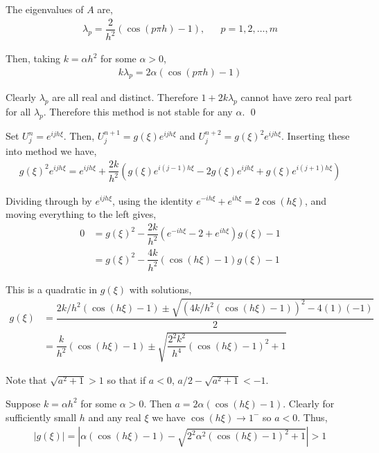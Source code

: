 \documentclass[10pt]{article}
\begin{document}
\begin{solution}[Solution]
\begin{enumerate}[label=(\alph*)]
    The eigenvalues of \( A \) are,
    \begin{align*}
        \lambda_p = \dfrac{2}{h^2}(\cos(p\pi h)-1), && p=1,2,\ldots, m
    \end{align*}

    Then, taking \( k = \alpha h^2 \) for some \( \alpha > 0 \),
    \begin{align*}
        k\lambda_p = 2\alpha(\cos(p\pi h)-1)
    \end{align*}

    Clearly \( \lambda_p \) are all real and distinct. Therefore \( 1 + 2k\lambda_p \) cannot have zero real part for all \( \lambda_p \).  Therefore this method is not stable for any \( \alpha \). \qed

    Set \( U_j^n = e^{ijh\xi} \). Then, \( U_j^{n+1} = g(\xi)e^{ijh\xi} \) and \( U_j^{n+2} = g(\xi)^2e^{ijh\xi} \). Inserting these into method we have,
    \begin{align*}
        g(\xi)^2e^{ijh\xi} = e^{ijh\xi} + \dfrac{2k}{h^2}\left( g(\xi)e^{i(j-1)h\xi} - 2g(\xi)e^{ijh\xi} + g(\xi)e^{i(j+1)h\xi} \right)
    \end{align*}

    Dividing through by \( e^{ijh\xi} \), using the identity \( e^{-ih\xi} + e^{ih\xi} = 2\cos(h\xi) \), and moving everything to the left gives,
    \begin{align*}
        0 &= g(\xi)^2 - \dfrac{2k}{h^2}\left( e^{-ih\xi} - 2 + e^{ih\xi} \right)g(\xi) - 1
        \\&= g(\xi)^2 - \dfrac{4k}{h^2}(\cos(h\xi)-1)g(\xi) - 1
    \end{align*}

    This is a quadratic in \( g(\xi) \) with solutions,
    \begin{align*}
        g(\xi) &= \dfrac{2k/h^2(\cos(h\xi)-1) \pm \sqrt{(4k/h^2(\cos(h\xi)-1))^2-4(1)(-1)}}{2}
        \\&= \dfrac{k}{h^2}(\cos(h\xi)-1) \pm \sqrt{\dfrac{2^2k^2}{h^4}(\cos(h\xi)-1)^2+1}
    \end{align*}

    Note that \( \sqrt{a^2+1} > 1 \) so that if \( a < 0 \), \( a/2 - \sqrt{a^2+1} < -1 \).

    Suppose \( k = \alpha h^2 \) for some \( \alpha > 0 \). Then \( a = 2\alpha(\cos(h\xi)-1) \). Clearly for sufficiently small \( h \) and any real \( \xi \) we have \( \cos(h\xi) \to 1^- \) so \( a<0 \). Thus,
    \begin{align*}
        |g(\xi)| = \left|\alpha(\cos(h\xi)-1) - \sqrt{2^2\alpha^2 (\cos(h\xi)-1)^2+1}\right| > 1
    \end{align*}


\end{enumerate}
\end{solution}
\end{document}
